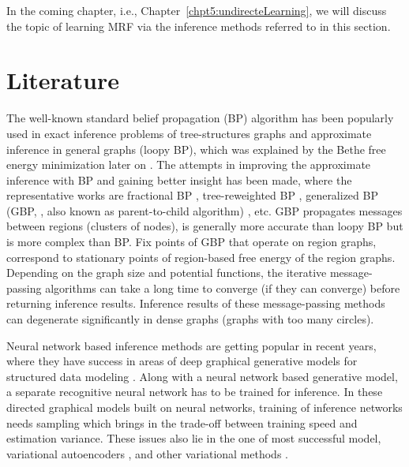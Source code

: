In the coming chapter, i.e., Chapter~\ref{chpt5:undirecteLearning}, we will discuss the topic of learning MRF via the inference methods referred to in this section.

\section{Literature}\label{chpt4:sec:literature}

The well-known standard belief propagation (BP) algorithm \cite{Pearl1982reverend,kschischang2001factor_graph} has been popularly used in exact inference problems of tree-structures graphs and approximate inference in general graphs (loopy BP), which was explained by the Bethe free energy minimization later on \cite{yedidia2003understanding}. The attempts in improving the approximate inference with BP and gaining better insight has been made, where the representative works are fractional BP \cite{Wiegerinck:2002:FBP:2968618.2968673}, tree-reweighted BP \cite{wainwright2008graphical}, generalized BP (GBP, , also known as parent-to-child algorithm) \cite{Yedidia:2000:GBP:3008751.3008848, yedida2005constucting}, etc. 
GBP propagates messages between regions (clusters of nodes), is generally more accurate than loopy BP but is more complex than BP. Fix points of GBP that operate on region graphs, correspond to stationary points of region-based free energy of the region graphs. Depending on the graph size and potential functions, the iterative message-passing algorithms can take a long time to converge (if they can converge) before returning inference results. Inference results of these message-passing methods can degenerate significantly in dense graphs (graphs with too many circles).

Neural network based inference methods are getting popular in recent years, where they have success in areas of deep graphical generative models for structured data modeling \cite{qu2019gmnn, johansonNIPS2016_6379, li2018graphical}. Along with a neural network based generative model, a separate recognitive neural network has to be trained for inference. In these directed graphical models built on neural networks, training of inference networks needs sampling which brings in the trade-off between training speed and estimation variance. These issues also lie in the one of most successful model, variational autoencoders \cite{DBLP:journals/corr/KingmaW13,2017arXiv170104722M, 2017arXiv171101558T}, and other variational methods \cite{kuleshov2017neural_variational, dustin2017hierarchical}.


